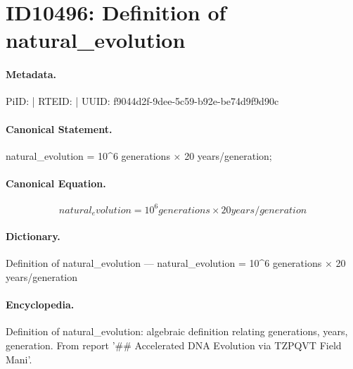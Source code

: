 \section*{ID10496: Definition of natural\_evolution}
\paragraph{Metadata.}
PiID:  | RTEID:  | UUID: f9044d2f-9dee-5c59-b92e-be74d9f9d90c

\paragraph{Canonical Statement.}
natural\_evolution = 10\textasciicircum{}6 generations × 20 years/generation;

\paragraph{Canonical Equation.}
\[
natural_evolution = 10^6 generations × 20 years/generation
\]

\paragraph{Dictionary.}
Definition of natural\_evolution — natural\_evolution = 10\textasciicircum{}6 generations × 20 years/generation

\paragraph{Encyclopedia.}
Definition of natural\_evolution: algebraic definition relating generations, years, generation. From report '\#\# Accelerated DNA Evolution via TZPQVT Field Mani'.
